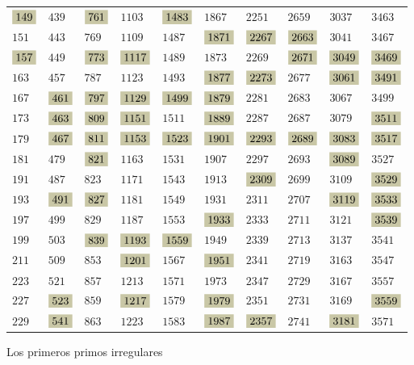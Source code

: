 \documentclass{article}
\numberwithin{equation}{section}
\newcommand{\highlight}[1]{\colorbox{shadecolor}{$\displaystyle #1$}}
\theoremstyle{definition}
\begin{document}
\begin{center}
{\begin{tabular}{x{1cm}x{1cm}x{1cm}x{1cm}x{1cm}x{1cm}x{1cm}x{1cm}x{1cm}x{1cm}}
      $\highlight{149}$ & $439$ & $\highlight{761}$ & $1103$ & $\highlight{1483}$ & $1867$ & $2251$ & $2659$ & $3037$ & $3463$ \tabularnewline
      $151$ & $443$ & $769$ & $1109$ & $1487$ & $\highlight{1871}$ & $\highlight{2267}$ & $\highlight{2663}$ & $3041$ & $3467$ \tabularnewline
      $\highlight{157}$ & $449$ & $\highlight{773}$ & $\highlight{1117}$ & $1489$ & $1873$ & $2269$ & $\highlight{2671}$ & $\highlight{3049}$ & $\highlight{3469}$ \tabularnewline
      $163$ & $457$ & $787$ & $1123$ & $1493$ & $\highlight{1877}$ & $\highlight{2273}$ & $2677$ & $\highlight{3061}$ & $\highlight{3491}$ \tabularnewline
      $167$ & $\highlight{461}$ & $\highlight{797}$ & $\highlight{1129}$ & $\highlight{1499}$ & $\highlight{1879}$ & $2281$ & $2683$ & $3067$ & $3499$ \tabularnewline
      $173$ & $\highlight{463}$ & $\highlight{809}$ & $\highlight{1151}$ & $1511$ & $\highlight{1889}$ & $2287$ & $2687$ & $3079$ & $\highlight{3511}$ \tabularnewline
      $179$ & $\highlight{467}$ & $\highlight{811}$ & $\highlight{1153}$ & $\highlight{1523}$ & $\highlight{1901}$ & $\highlight{2293}$ & $\highlight{2689}$ & $\highlight{3083}$ & $\highlight{3517}$ \tabularnewline
      $181$ & $479$ & $\highlight{821}$ & $1163$ & $1531$ & $1907$ & $2297$ & $2693$ & $\highlight{3089}$ & $3527$ \tabularnewline
      $191$ & $487$ & $823$ & $1171$ & $1543$ & $1913$ & $\highlight{2309}$ & $2699$ & $3109$ & $\highlight{3529}$ \tabularnewline
      $193$ & $\highlight{491}$ & $\highlight{827}$ & $1181$ & $1549$ & $1931$ & $2311$ & $2707$ & $\highlight{3119}$ & $\highlight{3533}$ \tabularnewline
      $197$ & $499$ & $829$ & $1187$ & $1553$ & $\highlight{1933}$ & $2333$ & $2711$ & $3121$ & $\highlight{3539}$ \tabularnewline
      $199$ & $503$ & $\highlight{839}$ & $\highlight{1193}$ & $\highlight{1559}$ & $1949$ & $2339$ & $2713$ & $3137$ & $3541$ \tabularnewline
      $211$ & $509$ & $853$ & $\highlight{1201}$ & $1567$ & $\highlight{1951}$ & $2341$ & $2719$ & $3163$ & $3547$ \tabularnewline
      $223$ & $521$ & $857$ & $1213$ & $1571$ & $1973$ & $2347$ & $2729$ & $3167$ & $3557$ \tabularnewline
      $227$ & $\highlight{523}$ & $859$ & $\highlight{1217}$ & $1579$ & $\highlight{1979}$ & $2351$ & $2731$ & $3169$ & $\highlight{3559}$ \tabularnewline
      $229$ & $\highlight{541}$ & $863$ & $1223$ & $1583$ & $\highlight{1987}$ & $\highlight{2357}$ & $2741$ & $\highlight{3181}$ & $3571$ \tabularnewline
    \end{tabular}}

  \vspace{1em}

  Los primeros primos irregulares
\end{center}
\end{document}
